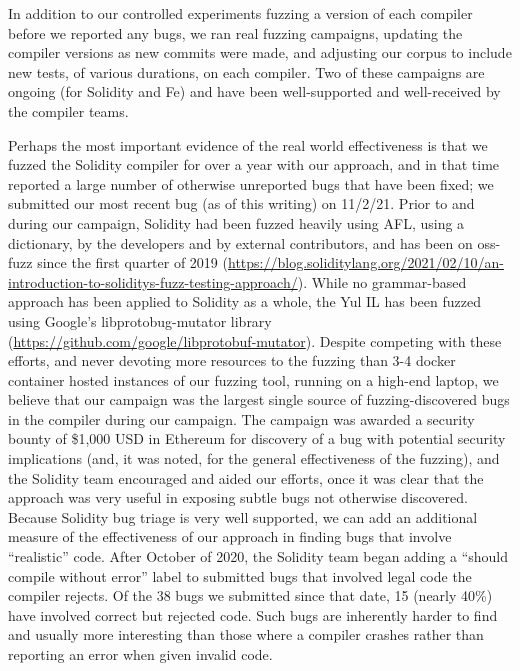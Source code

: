 In addition to our controlled experiments fuzzing a version of each compiler before we reported any bugs, we ran real fuzzing campaigns, updating the compiler versions as new commits were made, and adjusting our corpus to include new tests, of various durations, on each compiler.  Two of these campaigns are ongoing (for Solidity and Fe) and have been well-supported and well-received by the compiler teams.

\begin{sloppypar}
  Perhaps the most important evidence of the real world effectiveness is that we fuzzed the Solidity compiler for over a year with our approach, and in that time reported a large number of otherwise unreported bugs that have been fixed; we submitted our most recent bug (as of this writing) on 11/2/21.  Prior to and during our campaign, Solidity had been fuzzed heavily using AFL, using a dictionary, by the developers and by external contributors, and has been on oss-fuzz since the first quarter of 2019 (\url{https://blog.soliditylang.org/2021/02/10/an-introduction-to-soliditys-fuzz-testing-approach/}).  While no grammar-based approach has been applied to Solidity as a whole, the Yul IL has been fuzzed using Google's libprotobug-mutator library (\url{https://github.com/google/libprotobuf-mutator}).  Despite competing with these efforts, and never devoting more resources to the fuzzing than 3-4 docker container hosted instances of our fuzzing tool, running on a high-end laptop, we believe that our campaign was the largest single source of fuzzing-discovered bugs in the compiler during our campaign.  The campaign was awarded a security bounty of \$1,000 USD in Ethereum for discovery of a bug with potential security implications (and, it was noted, for the general effectiveness of the fuzzing), and the Solidity team encouraged and aided our efforts, once it was clear that the approach was very useful in exposing subtle bugs not otherwise discovered.  Because Solidity bug triage is very well supported, we can add an additional measure of the effectiveness of our approach in finding bugs that involve ``realistic'' code.  After October of 2020, the Solidity team began adding a ``should compile without error'' label to submitted bugs that involved legal code the compiler rejects.  Of the 38 bugs we submitted since that date, 15 (nearly 40\%) have involved correct but rejected code.  Such bugs are inherently harder to find and usually more interesting than those where a compiler crashes rather than reporting an error when given invalid code.
\end{sloppypar}

